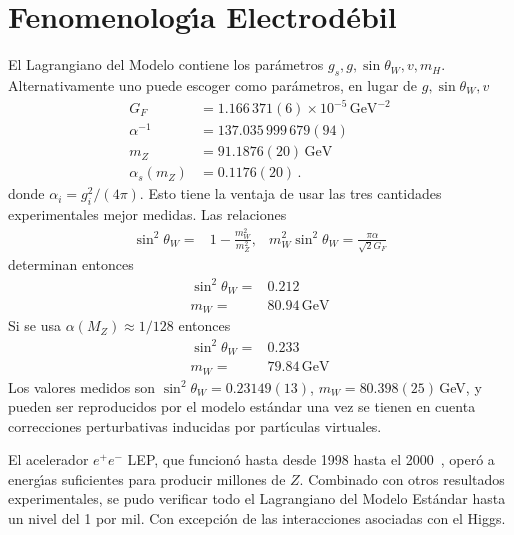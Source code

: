 \section{Fenomenolog\'\i a Electrod\'ebil}
\label{sec:fenom-electr}
El Lagrangiano del Modelo contiene los par\'ametros $g_s,g,\sin\theta_W,v,m_H$. Alternativamente uno puede escoger como par\'ametros, en lugar de $g,\sin\theta_W,v$ \cite{a}
\begin{align}
  \label{eq:233}
  G_F&=1.166\,371(6)\times10^{-5}\,\text{GeV}^{-2}\nonumber\\
  \alpha^{-1}&=137.035\,999\,679(94)\nonumber\\
  m_Z&=91.1876(20)\,\text{GeV}\nonumber\\
  \alpha_s(m_Z)&=0.1176(20)\,.
\end{align}
donde $\alpha_i=g_i^2/(4\pi)$. 
Esto tiene la ventaja de usar las tres cantidades experimentales mejor medidas. Las relaciones
\begin{align}
  \sin^2\theta_W=&1-\frac{m_W^2}{m_Z^2},&m_W^2\sin^2\theta_W=\frac{\pi\alpha}{\sqrt{2}G_F}
\end{align}
determinan entonces
\begin{align}
  \sin^2\theta_W=&0.212\nonumber\\
  m_W=&80.94\,\text{GeV}
\end{align}
Si se usa $\alpha(M_Z)\approx1/128$ entonces
\begin{align}
   \sin^2\theta_W=&0.233\nonumber\\
  m_W=&79.84\,\text{GeV}
\end{align}
Los valores medidos son $\sin^2\theta_W=0.23149(13)$, $m_W=80.398(25)\,$GeV, y pueden ser reproducidos por el modelo est\'andar una vez se tienen en cuenta correcciones perturbativas inducidas por part\'\i culas virtuales.

El acelerador $e^+e^-$ LEP, que funcion\'o hasta desde 1998 hasta el 2000~\cite{LEP}, oper\'o a energ\'\i as suficientes para producir millones de $Z$. Combinado con otros resultados experimentales, se pudo verificar todo el Lagrangiano del Modelo Est\'andar hasta un nivel del 1 por mil. Con excepci\'on de las interacciones asociadas con el Higgs. 


